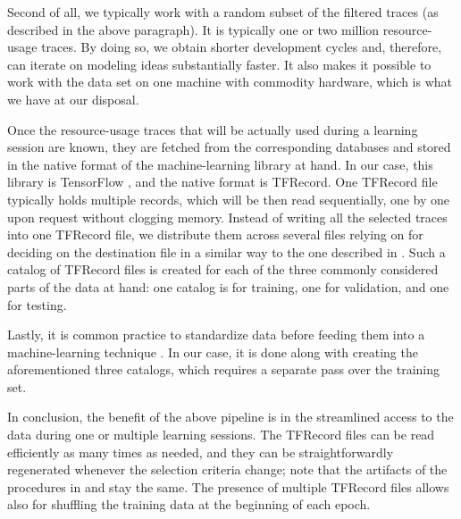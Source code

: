 Second of all, we typically work with a random subset of the filtered traces (as
described in the above paragraph). It is typically one or two million
resource-usage traces. By doing so, we obtain shorter development cycles and,
therefore, can iterate on modeling ideas substantially faster. It also makes it
possible to work with the data set on one machine with commodity hardware, which
is what we have at our disposal.

Once the resource-usage traces that will be actually used during a learning
session are known, they are fetched from the corresponding databases and stored
in the native format of the machine-learning library at hand. In our case, this
library is TensorFlow \cite{abadi2015}, and the native format is TFRecord. One
TFRecord file typically holds multiple records, which will be then read
sequentially, one by one upon request without clogging memory. Instead of
writing all the selected traces into one TFRecord file, we distribute them
across several files relying on  for deciding on the destination file in
a similar way to the one described in . Such a catalog of
TFRecord files is created for each of the three commonly considered parts
\cite{hastie2009} of the data at hand: one catalog is for training, one for
validation, and one for testing.

Lastly, it is common practice to standardize data before feeding them into a
machine-learning technique \cite{hastie2009}. In our case, it is done along with
creating the aforementioned three catalogs, which requires a separate pass over
the training set.

In conclusion, the benefit of the above pipeline is in the streamlined access to
the data during one or multiple learning sessions. The TFRecord files can be
read efficiently as many times as needed, and they can be straightforwardly
regenerated whenever the selection criteria change; note that the artifacts of
the procedures in  and  stay the same. The
presence of multiple TFRecord files allows also for shuffling the training data
at the beginning of each epoch.
